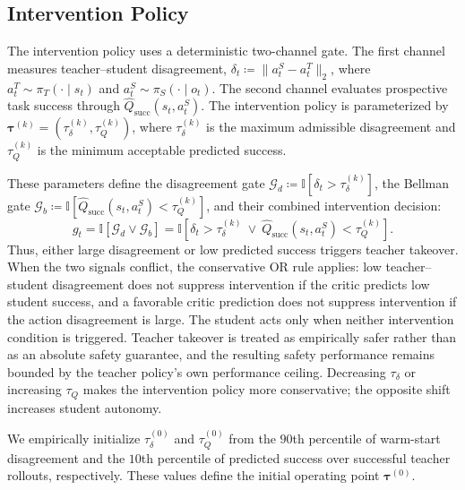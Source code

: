\subsection{Intervention Policy}
The intervention policy uses a deterministic two-channel gate. The
first channel measures teacher--student disagreement,
$\delta_t\coloneqq\lVert a_t^S-a_t^T\rVert_2$, where
$a_t^T\sim\pi_T(\cdot\mid s_t)$ and $a_t^S\sim\pi_S(\cdot\mid o_t)$. The second
channel evaluates prospective task success through
$\hat Q_{\mathrm{succ}}(s_t,a_t^S)$. The intervention policy is parameterized by
$\boldsymbol{\tau}^{(k)}=(\tau_\delta^{(k)},\tau_Q^{(k)})$, where
$\tau_\delta^{(k)}$ is the maximum admissible disagreement and
$\tau_Q^{(k)}$ is the minimum acceptable predicted success.

These parameters define the disagreement gate
$\mathcal{G}_d\coloneqq\mathbb{I}[\delta_t>\tau_\delta^{(k)}]$, the Bellman gate
$\mathcal{G}_b\coloneqq\mathbb{I}[\hat Q_{\mathrm{succ}}(s_t,a_t^S)<\tau_Q^{(k)}]$,
and their combined intervention decision:
\begingroup
\small
\begin{equation}
g_t=\mathbb{I}\!\left[\mathcal{G}_d\lor\mathcal{G}_b\right]
=\mathbb{I}\!\left[\delta_t>\tau_\delta^{(k)}\ \lor\
\hat Q_{\mathrm{succ}}(s_t,a_t^S)<\tau_Q^{(k)}\right].
\label{eq:adaptive_gate}
\end{equation}
\endgroup
Thus, either large disagreement or low predicted success triggers teacher
takeover. When the two signals conflict, the conservative OR rule applies: low
teacher--student disagreement does not suppress intervention if the critic
predicts low student success, and a favorable critic prediction does not
suppress intervention if the action disagreement is large. The student acts
only when neither intervention condition is triggered. Teacher takeover is treated as
empirically safer rather than as an absolute safety guarantee, and the resulting
safety performance remains bounded by the teacher policy's own performance
ceiling. Decreasing $\tau_\delta$ or increasing $\tau_Q$ makes the intervention
policy more conservative; the opposite shift increases student autonomy.

We empirically initialize $\tau_\delta^{(0)}$ and $\tau_Q^{(0)}$ from the $90$th
percentile of warm-start disagreement and the $10$th percentile of predicted
success over successful teacher rollouts, respectively. These values define the
initial operating point $\boldsymbol{\tau}^{(0)}$.

